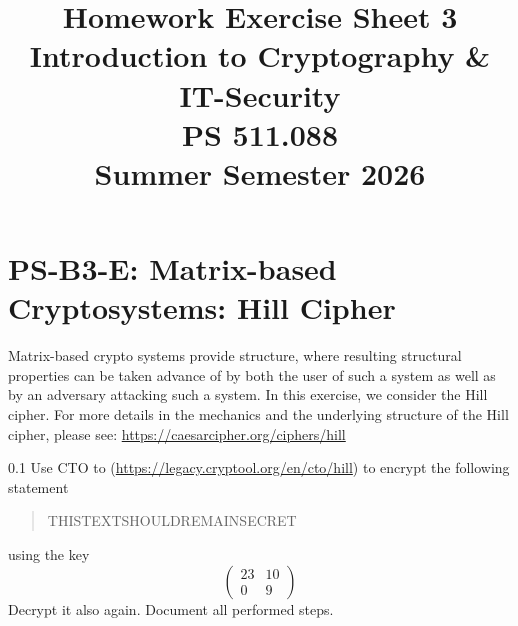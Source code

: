 \documentclass[]{scrartcl}
\title{Homework Exercise Sheet 3\\Introduction to Cryptography \& IT-Security\\PS 511.088\\Summer Semester 2026}
\author{\groupname}
\newcounter{exercise}
\newcounter{qid}[section]
\newcommand{\exerciseprefix}{prefix}
\newcommand{\questiontitle}{Questions}
\newcommand{\blockid}{B3}
\newcommand{\exname}{}
\begin{document}
\maketitle
{}
\date{}

\pagebreak




\pagebreak
\renewcommand{\exname}{Matrix-based Cryptosystems: Hill Cipher}
\section*{PS-\blockid{}-E\theexercise: \exname{}}
Matrix-based crypto systems provide structure, where resulting structural properties can be taken advance of by both the user of such a system as well as by an adversary attacking such a system. In this exercise, we consider the Hill cipher. For more details in the mechanics and the underlying structure of the Hill cipher, please see: \url{https://caesarcipher.org/ciphers/hill}



\renewcommand{\exerciseprefix}{PS-\blockid{}-E\theexercise: \exname-Q\theqid}
\renewcommand{\questiontitle}{\exerciseprefix{}: Encryption/Decryption in CTO}
\begin{exercisebox}{0.1}
Use CTO to (\url{https://legacy.cryptool.org/en/cto/hill}) to encrypt the following statement
\begin{quote}
    THISTEXTSHOULDREMAINSECRET
\end{quote}
using the key
\begin{equation}
    \begin{pmatrix}
    23 & 10 \\
     0 &  9
     \end{pmatrix}
\end{equation}
Decrypt it also again. Document all performed steps.  
\end{exercisebox}
\end{document}
